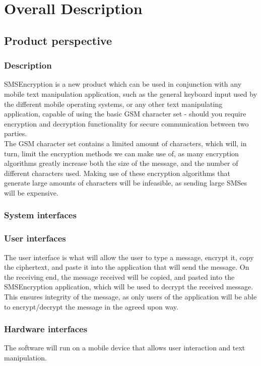 \section{Overall Description}

\subsection{Product perspective}

\subsubsection{Description}
SMSEncryption is a new product which can be used in conjunction with any mobile text manipulation application, such as the general keyboard input used by the different mobile operating systems, or any other text manipulating application, capable of using the basic GSM character set - should you require encryption and decryption functionality for secure communication between two parties.
\vspace{12pt}\\
The GSM character set contains a limited amount of characters, which will, in turn, limit the encryption methods we can make use of, as many encryption algorithms greatly increase both the size of the message, and the number of different characters used. Making use of these encryption algorithms that generate large amounts of characters will be infeasible, as sending large SMSes will be expensive.
\subsubsection{System interfaces}

\subsubsection{User interfaces}
 The user interface is what will allow the user to type a message, encrypt it, copy the ciphertext, and paste it into the application that will send the message. On the receiving end, the message received will be copied, and pasted into the SMSEncryption application, which will be used to decrypt the received message. This ensures integrity of the message, as only users of the application will be able to encrypt/decrypt the message in the agreed upon way.
\subsubsection{Hardware interfaces}
The software will run on a mobile device that allows user interaction and text manipulation.
